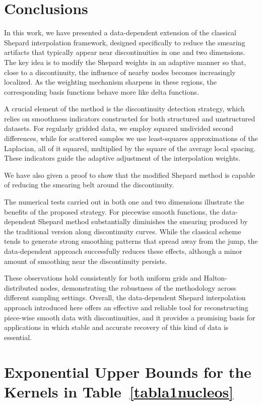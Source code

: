 \documentclass[preprint]{elsarticle}       %
\begin{document}
\section{Conclusions}
In this work, we have presented a data-dependent extension of the classical Shepard interpolation framework, designed specifically to reduce the smearing artifacts that typically appear near discontinuities in one and two dimensions. The key idea is to modify the Shepard weights in an adaptive manner so that, close to a discontinuity, the influence of nearby nodes becomes increasingly localized. As the weighting mechanism sharpens in these regions, the corresponding basis functions behave more like delta functions.

A crucial element of the method is the discontinuity detection strategy, which relies on smoothness indicators constructed for both structured and unstructured datasets. For regularly gridded data, we employ squared undivided second differences, while for scattered samples we use least-squares approximations of the Laplacian, all of it squared, multiplied by the square of the average local spacing. These indicators guide the adaptive adjustment of the interpolation weights.

We have also given a proof to show that the modified Shepard method is capable of reducing the smearing belt around the discontinuity.

The numerical tests carried out in both one and two dimensions illustrate the benefits of the proposed strategy. For piecewise smooth functions, the data-dependent Shepard method substantially diminishes the smearing produced by the traditional version along discontinuity curves. While the classical scheme tends to generate strong smoothing patterns that spread away from the jump, the data-dependent approach successfully reduces these effects, although a minor amount of smoothing near the discontinuity persists. 

These observations hold consistently for both uniform grids and Halton-distributed nodes, demonstrating the robustness of the methodology across different sampling settings. Overall, the data-dependent Shepard interpolation approach introduced here offers an effective and reliable tool for reconstructing piece-wise smooth data with discontinuities, and it provides a promising basis for applications in which stable and accurate recovery of this kind of data is essential.


\appendix
\section{Exponential Upper Bounds for the Kernels in Table~\ref{tabla1nucleos}}\label{apendice}
\end{document}
